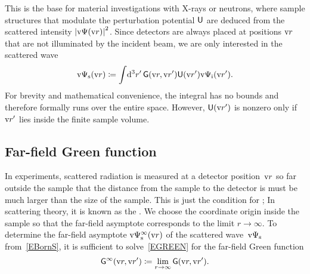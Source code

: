 This is the base for material investigations with X-rays or neutrons,
where sample structures that modulate the perturbation potential $\mathsf{U}$
are deduced from the scattered intensity ${|\text{v}\Psi(\text{v}{r})|}^2$.
Since detectors are always placed at positions $\text{v}{r}$
that are not illuminated by the incident beam,
we are only interested in the scattered wave
%
%
\begin{equation}\label{EBornS}
  \text{v}\Psi_\text{s}(\text{v}{r})
  \coloneqq
  \int\!\mathrm d^3r'\, \mathsf{G}(\text{v}{r},\text{v}{r}') \mathsf{U}(\text{v}{r}') \text{v}\Psi_{\text{i}}(\text{v}{r}').
\end{equation}
%
%
For brevity and mathematical convenience,
the integral has no bounds
and therefore formally runs over the entire space.
However, $\mathsf{U}(\text{v}{r}')$ is nonzero only if $\text{v}{r}'$ lies inside the finite sample volume.

\subsection{Far-field Green function}\label{SDWGreen}

In experiments, scattered radiation is measured
at a detector position~$\text{v}{r}$ so far outside the sample
that the distance from the sample to the detector
is must be much larger than the size of the sample.
This is just the condition for ;
%
In scattering theory,
it is known as the .
%
We choose the coordinate origin
%
%
inside the sample so that the far-field asymptote corresponds to the limit $r\to\infty$.
To determine the far-field asymptote $\text{v}\Psi_\text{s}^\infty(\text{v}{r})$
of the scattered wave~$\text{v}\Psi_\text{s}$ from~\cref{EBornS},
it is sufficient to solve~\cref{EGREEN} for the far-field Green function
\begin{equation}\label{EGinftydef}
  \mathsf{G}^\infty(\text{v}{r},\text{v}{r}')\coloneqq \lim_{r\to\infty} \mathsf{G}(\text{v}{r},\text{v}{r}').
\end{equation}

